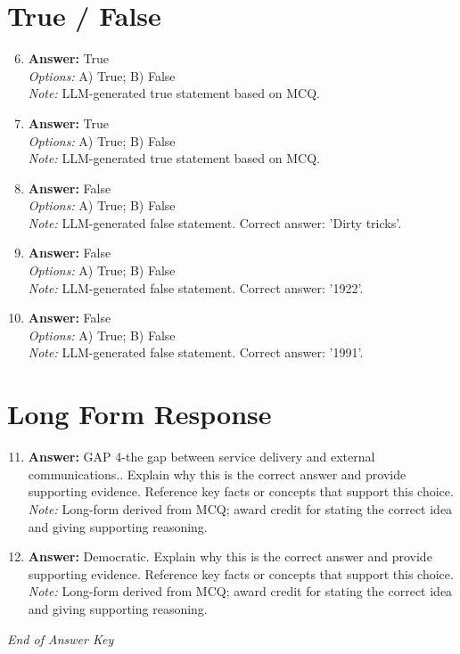 \documentclass[12pt]{article}
\begin{document}
\section*{True / False}
\begin{enumerate}[label=\arabic*.]
\setcounter{enumi}{5}
\item \textbf{Answer:} True
\\ \textit{Options:} A) True; B) False
\\ \textit{Note:} LLM-generated true statement based on MCQ.
\item \textbf{Answer:} True
\\ \textit{Options:} A) True; B) False
\\ \textit{Note:} LLM-generated true statement based on MCQ.
\item \textbf{Answer:} False
\\ \textit{Options:} A) True; B) False
\\ \textit{Note:} LLM-generated false statement. Correct answer: 'Dirty tricks'.
\item \textbf{Answer:} False
\\ \textit{Options:} A) True; B) False
\\ \textit{Note:} LLM-generated false statement. Correct answer: '1922'.
\item \textbf{Answer:} False
\\ \textit{Options:} A) True; B) False
\\ \textit{Note:} LLM-generated false statement. Correct answer: '1991'.
\end{enumerate}

\section*{Long Form Response}
\begin{enumerate}[label=\arabic*.]
\setcounter{enumi}{10}
\item \textbf{Answer:} GAP 4-the gap between service delivery and external communications.. Explain why this is the correct answer and provide supporting evidence. Reference key facts or concepts that support this choice.
\\ \textit{Note:} Long-form derived from MCQ; award credit for stating the correct idea and giving supporting reasoning.
\item \textbf{Answer:} Democratic. Explain why this is the correct answer and provide supporting evidence. Reference key facts or concepts that support this choice.
\\ \textit{Note:} Long-form derived from MCQ; award credit for stating the correct idea and giving supporting reasoning.
\end{enumerate}

\vfill
\noindent\textit{End of Answer Key}
\end{document}
